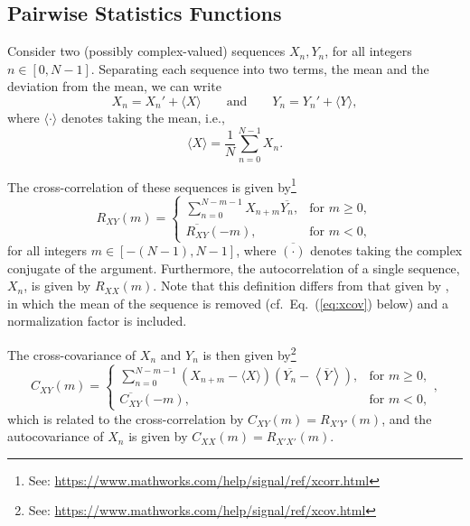 \documentclass[11pt, oneside]{article}
\newcommand{\eqnref}[1]{Eq.~(\ref{#1})}
\begin{document}
\subsection{Pairwise Statistics Functions}
Consider two (possibly complex-valued) sequences $X_n,Y_n$, for all integers $n \in [0,N-1]$.
Separating each sequence into two terms, the mean and the deviation from the mean, we can write
\begin{equation}
X_n = X_n' + \langle X \rangle
\quad\quad \text{and} \quad\quad
Y_n = Y_n' + \langle Y \rangle,
\end{equation}
where $\langle \cdot \rangle$ denotes taking the mean, i.e.,
\begin{equation}
\langle X \rangle = \frac{1}{N} \sum_{n = 0}^{N-1} X_n.
\end{equation}

The cross-correlation of these sequences is given by\footnote{See: \url{https://www.mathworks.com/help/signal/ref/xcorr.html}}
\begin{equation}\label{eq:xcorr}
R_{XY}(m) =
\begin{cases}
\displaystyle \sum_{n=0}^{N-m-1} X_{n+m} \overline{Y_n}, & \text{for } m \geq 0,\\[20pt]
\overline{R_{XY}}(-m), & \text{for } m < 0,
\end{cases}
\end{equation}
for all integers $m \in [-(N-1),N-1]$, where $\overline{(\cdot)}$ denotes taking the complex conjugate of the argument.
Furthermore, the autocorrelation of a single sequence, $X_n$, is given by $R_{XX}(m)$.
Note that this definition differs from that given by \citet[Sec.~8.2.1]{Stull1988}, in which the mean of the sequence is removed (cf.~\eqnref{eq:xcov} below) and a normalization factor is included.

The cross-covariance of $X_n$ and $Y_n$ is then given by\footnote{See: \url{https://www.mathworks.com/help/signal/ref/xcov.html}}
\begin{equation}\label{eq:xcov}
C_{XY}(m) = 
\begin{cases}
\displaystyle \sum_{n=0}^{N-m-1} \left( X_{n+m} - \langle X \rangle \right) \left( \overline{Y_n} - \left\langle \overline{Y} \right\rangle \right), & \text{for } m \geq 0,\\[20pt]
\overline{C_{XY}}(-m), & \text{for } m < 0,
\end{cases},
\end{equation}
which is related to the cross-correlation by $C_{XY}(m) = R_{X'Y'}(m)$, and the autocovariance of $X_n$ is given by $C_{XX}(m) = R_{X'X'}(m)$.
\end{document}

